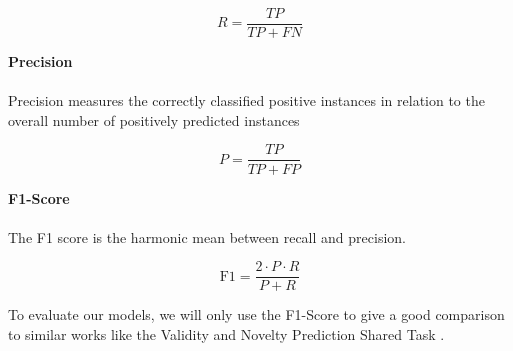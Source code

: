 \begin{equation}
	R = \frac{TP}{TP + FN}
\end{equation}

\textbf{Precision} \\ \\
Precision measures the correctly classified positive instances in relation to the overall number of positively predicted instances

\begin{equation}
	P = \frac{TP}{TP + FP}
\end{equation}

\textbf{F1-Score} \\ \\
The F1 score is the harmonic mean between recall and precision.

\begin{equation}
	\text{F1} = \frac{2 \cdot P \cdot R}{P + R}
\end{equation}

To evaluate our models, we will only use the F1-Score to give a good comparison to similar works like the Validity and Novelty Prediction Shared Task \cite{argsvalnov2022}.